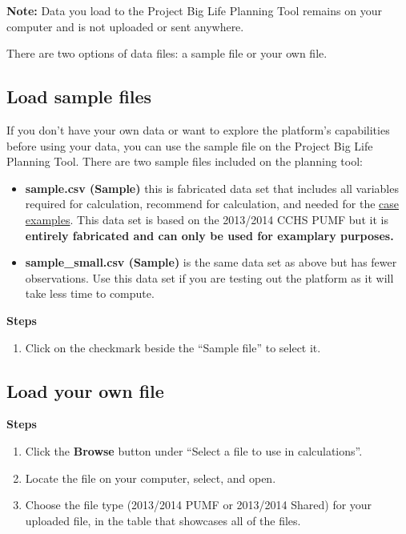 \documentclass[]{book}
\providecommand{\tightlist}{%
  \setlength{\itemsep}{0pt}\setlength{\parskip}{0pt}}
\begin{document}
\textbf{Note:} Data you load to the Project Big Life Planning Tool remains on your computer and is not uploaded or sent anywhere.

There are two options of data files: a sample file or your own file.

\hypertarget{load-sample-files}{%
\subsection{Load sample files}\label{load-sample-files}}

If you don't have your own data or want to explore the platform's capabilities before using your data, you can use the sample file on the Project Big Life Planning Tool. There are two sample files included on the planning tool:

\begin{itemize}
\tightlist
\item
  \textbf{sample.csv (Sample)} this is fabricated data set that includes all variables required for calculation, recommend for calculation, and needed for the \protect\hyperlink{caseexamples}{case examples}. This data set is based on the 2013/2014 CCHS PUMF but it is \textbf{entirely fabricated and can only be used for examplary purposes.}
\item
  \textbf{sample\_small.csv (Sample)} is the same data set as above but has fewer observations. Use this data set if you are testing out the platform as it will take less time to compute.
\end{itemize}

\textbf{Steps}

\begin{enumerate}
\def\labelenumi{\arabic{enumi}.}
\tightlist
\item
  Click on the checkmark beside the ``Sample file'' to select it.
\end{enumerate}

\hypertarget{load-your-own-file}{%
\subsection{Load your own file}\label{load-your-own-file}}

\textbf{Steps}

\begin{enumerate}
\def\labelenumi{\arabic{enumi}.}
\item
  Click the \textbf{Browse} button under ``Select a file to use in calculations''.
\item
  Locate the file on your computer, select, and open.
\item
  Choose the file type (2013/2014 PUMF or 2013/2014 Shared) for your uploaded file, in the table that showcases all of the files.
\end{enumerate}
\end{document}
